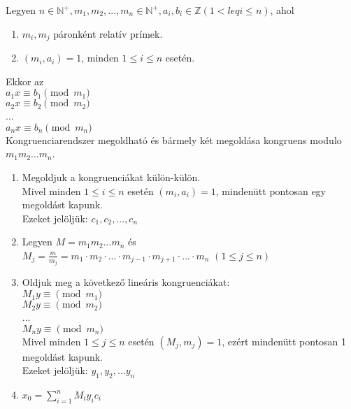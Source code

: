 \begin{frame}
  \begin{tcolorbox}[title={Tétel: Kínai maradéktétel}]
    Legyen $n \in \mathbb{N}^+, m_1, m_2, ..., m_n \in \mathbb{N}^+, a_i, b_i \in \mathbb{Z} (1 <leq i \leq n)$, ahol
    \begin{enumerate}
      \item $m_i, m_j$ páronként relatív prímek.
      \item $(m_i, a_i) = 1$, minden $1 \leq i \leq n$ esetén.
    \end{enumerate}
    Ekkor az\\
    \bigskip
    	$a_1x \equiv b_1 \pmod{m_1}$\\
    	$a_2x \equiv b_2 \pmod{m_2}$\\
    	...\\
    	$a_nx \equiv b_n \pmod{m_n}$\\
    \bigskip
    Kongruenciarendszer megoldható és bármely két megoldása kongruens modulo $m_1m_2...m_n$.
  \end{tcolorbox}

  \begin{tcolorbox}[title={Def.: A kínai maradéktétel megoldása}]
    \begin{enumerate}
      \item Megoldjuk a kongruenciákat külön-külön.\\
      Mivel minden  $1 \leq i \leq n$ esetén $(m_i, a_i) = 1$, mindenütt pontosan egy megoldást kapunk.\\
      Ezeket jelöljük: $c_1, c_2, ..., c_n$
      \item Legyen $M = m_1m_2...m_n$ és\\
      $M_j = \frac{m}{m_j} = m_1 \cdot m_2 \cdot ... \cdot m_{j - 1} \cdot m_{j + 1} \cdot ... \cdot m_n$ $(1 \leq j \leq n)$
      \item Oldjuk meg a következő lineáris kongruenciákat:\\
      $M_1y \equiv \pmod{m_1}$\\
      $M_2y \equiv \pmod{m_2}$\\
      ...\\
      $M_ny \equiv \pmod{m_n}$\\
      Mivel minden $1 \leq j \leq n$ esetén $(M_j, m_j) = 1$, ezért mindenütt pontosan 1 megoldást kapunk.\\
      Ezeket jelöljük: $y_1, y_2, ... y_n$
      \item $x_0 = \sum_{i = 1}^n M_iy_ic_i$
    \end{enumerate}
  \end{tcolorbox}
\end{frame}

